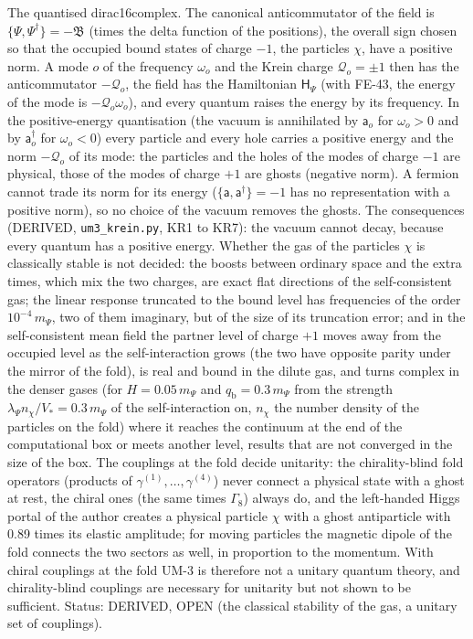 \documentclass[
  10pt,
]{article}
\begin{document}
The quantised dirac16complex. The canonical anticommutator of the field
is \(\{\Psi, \Psi^\dagger\} = -\mathfrak{B}\) (times the delta function
of the positions), the overall sign chosen so that the occupied bound
states of charge \(-1\), the particles \(\chi\), have a positive norm. A
mode \(o\) of the frequency \(\omega_o\) and the Krein charge
\(\mathcal{Q}_o = \pm1\) then has the anticommutator \(-\mathcal{Q}_o\),
the field has the Hamiltonian \(\mathsf{H}_\Psi\) (with FE-43, the
energy of the mode is \(-\mathcal{Q}_o\omega_o\)), and every quantum
raises the energy by its frequency. In the positive-energy quantisation
(the vacuum is annihilated by \(\mathsf{a}_o\) for \(\omega_o > 0\) and
by \(\mathsf{a}_o^\dagger\) for \(\omega_o < 0\)) every particle and
every hole carries a positive energy and the norm \(-\mathcal{Q}_o\) of
its mode: the particles and the holes of the modes of charge \(-1\) are
physical, those of the modes of charge \(+1\) are ghosts (negative
norm). A fermion cannot trade its norm for its energy
(\(\{\mathsf{a}, \mathsf{a}^\dagger\} = -1\) has no representation with
a positive norm), so no choice of the vacuum removes the ghosts. The
consequences (DERIVED, \texttt{um3\_krein.py}, KR1 to KR7): the vacuum
cannot decay, because every quantum has a positive energy. Whether the
gas of the particles \(\chi\) is classically stable is not decided: the
boosts between ordinary space and the extra times, which mix the two
charges, are exact flat directions of the self-consistent gas; the
linear response truncated to the bound level has frequencies of the
order \(10^{-4}\,m_\Psi\), two of them imaginary, but of the size of its
truncation error; and in the self-consistent mean field the partner
level of charge \(+1\) moves away from the occupied level as the
self-interaction grows (the two have opposite parity under the mirror of
the fold), is real and bound in the dilute gas, and turns complex in the
denser gases (for \(H = 0.05\,m_\Psi\) and
\(q_{\mathrm{b}} = 0.3\,m_\Psi\) from the strength
\(\lambda_\Psi n_\chi/V_* = 0.3\,m_\Psi\) of the self-interaction on,
\(n_\chi\) the number density of the particles on the fold) where it
reaches the continuum at the end of the computational box or meets
another level, results that are not converged in the size of the box.
The couplings at the fold decide unitarity: the chirality-blind fold
operators (products of \(\gamma^{(1)}, \dots, \gamma^{(4)}\)) never
connect a physical state with a ghost at rest, the chiral ones (the same
times \(\Gamma_8\)) always do, and the left-handed Higgs portal of the
author creates a physical particle \(\chi\) with a ghost antiparticle
with 0.89 times its elastic amplitude; for moving particles the magnetic
dipole of the fold connects the two sectors as well, in proportion to
the momentum. With chiral couplings at the fold UM-3 is therefore not a
unitary quantum theory, and chirality-blind couplings are necessary for
unitarity but not shown to be sufficient. Status: DERIVED, OPEN (the
classical stability of the gas, a unitary set of couplings).
\end{document}
